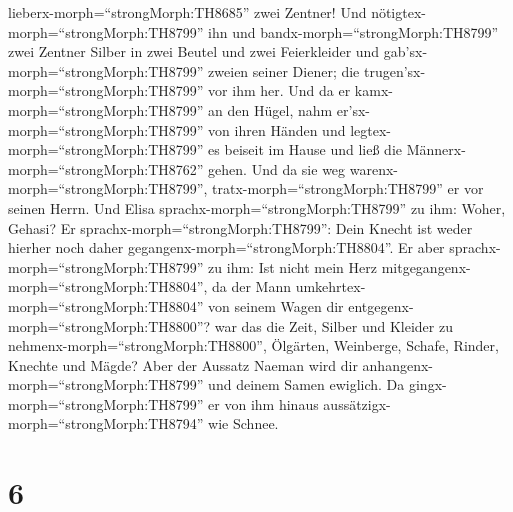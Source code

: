 lieberx-morph=``strongMorph:TH8685'' zwei Zentner! Und
nötigtex-morph=``strongMorph:TH8799'' ihn und
bandx-morph=``strongMorph:TH8799'' zwei Zentner Silber in zwei Beutel
und zwei Feierkleider und gab'sx-morph=``strongMorph:TH8799'' zweien
seiner Diener; die trugen'sx-morph=``strongMorph:TH8799'' vor ihm her.
 Und da er kamx-morph=``strongMorph:TH8799'' an den Hügel,
nahm er'sx-morph=``strongMorph:TH8799'' von ihren Händen und
legtex-morph=``strongMorph:TH8799'' es beiseit im Hause und ließ die
Männerx-morph=``strongMorph:TH8762'' gehen.  Und da sie weg
warenx-morph=``strongMorph:TH8799'', tratx-morph=``strongMorph:TH8799''
er vor seinen Herrn. Und Elisa sprachx-morph=``strongMorph:TH8799'' zu
ihm: Woher, Gehasi? Er sprachx-morph=``strongMorph:TH8799'': Dein Knecht
ist weder hierher noch daher gegangenx-morph=``strongMorph:TH8804''.
 Er aber sprachx-morph=``strongMorph:TH8799'' zu ihm: Ist
nicht mein Herz mitgegangenx-morph=``strongMorph:TH8804'', da der Mann
umkehrtex-morph=``strongMorph:TH8804'' von seinem Wagen dir
entgegenx-morph=``strongMorph:TH8800''? war das die Zeit, Silber und
Kleider zu nehmenx-morph=``strongMorph:TH8800'', Ölgärten, Weinberge,
Schafe, Rinder, Knechte und Mägde?  Aber der Aussatz Naeman
wird dir anhangenx-morph=``strongMorph:TH8799'' und deinem Samen
ewiglich. Da gingx-morph=``strongMorph:TH8799'' er von ihm hinaus
aussätzigx-morph=``strongMorph:TH8794'' wie Schnee.

\hypertarget{section-5}{%
\section{6}\label{section-5}}

